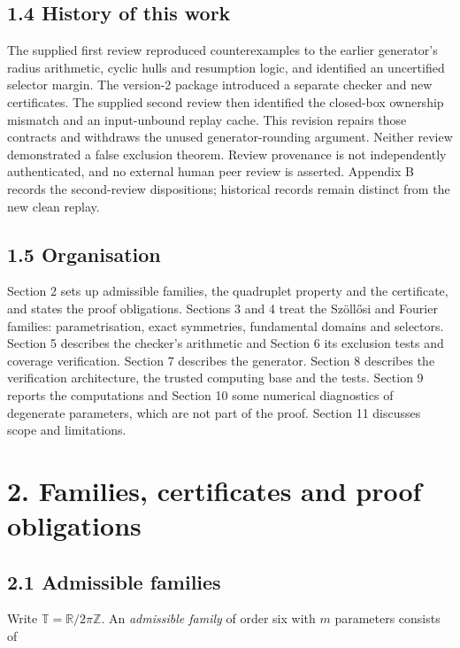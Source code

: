 \documentclass[
  11pt,
]{article}
\begin{document}
\subsection{1.4 History of this work}\label{history-of-this-work}

The supplied first review reproduced counterexamples to the earlier
generator's radius arithmetic, cyclic hulls and resumption logic, and
identified an uncertified selector margin. The version-2 package
introduced a separate checker and new certificates. The supplied second
review then identified the closed-box ownership mismatch and an
input-unbound replay cache. This revision repairs those contracts and
withdraws the unused generator-rounding argument. Neither review
demonstrated a false exclusion theorem. Review provenance is not
independently authenticated, and no external human peer review is
asserted. Appendix B records the second-review dispositions; historical
records remain distinct from the new clean replay.

\subsection{1.5 Organisation}\label{organisation}

Section 2 sets up admissible families, the quadruplet property and the
certificate, and states the proof obligations. Sections 3 and 4 treat
the Szöllősi and Fourier families: parametrisation, exact symmetries,
fundamental domains and selectors. Section 5 describes the checker's
arithmetic and Section 6 its exclusion tests and coverage verification.
Section 7 describes the generator. Section 8 describes the verification
architecture, the trusted computing base and the tests. Section 9
reports the computations and Section 10 some numerical diagnostics of
degenerate parameters, which are not part of the proof. Section 11
discusses scope and limitations.

\section{2. Families, certificates and proof
obligations}\label{families-certificates-and-proof-obligations}

\subsection{2.1 Admissible families}\label{admissible-families}

Write \(\mathbb T=\mathbb R/2\pi\mathbb Z\). An \emph{admissible family}
of order six with \(m\) parameters consists of
\end{document}
